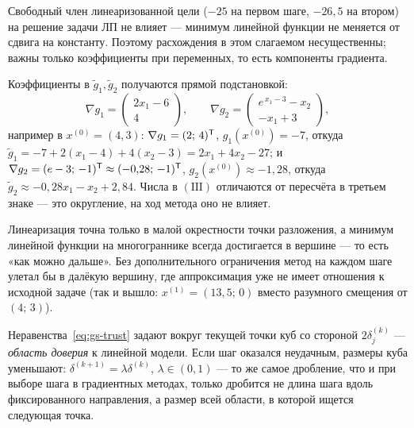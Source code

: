 \begin{idea}[title={О числах в примере}]
Свободный член линеаризованной цели ($-25$ на первом шаге, $-26{,}5$ на втором)
на решение задачи ЛП не влияет — минимум линейной функции не меняется от сдвига
на константу. Поэтому расхождения в этом слагаемом несущественны; важны только
коэффициенты при переменных, то есть компоненты градиента.

Коэффициенты в $\tilde g_1, \tilde g_2$ получаются прямой подстановкой:
\[
  \nabla g_1 = \begin{pmatrix} 2x_1 - 6 \\ 4 \end{pmatrix} ,
  \qquad
  \nabla g_2 = \begin{pmatrix} e^{\,x_1-3} - x_2 \\ -x_1 + 3 \end{pmatrix} ,
\]
например в $x^{(0)} = (4,3)$: $\nabla g_1 = (2;\,4)^{\mathsf{T}}$,
$g_1(x^{(0)}) = -7$, откуда $\tilde g_1 = -7 + 2(x_1-4) + 4(x_2-3)
= 2x_1 + 4x_2 - 27$; и $\nabla g_2 = (e - 3;\, -1)^{\mathsf{T}} \approx (-0{,}28;\,-1)^{\mathsf{T}}$,
$g_2(x^{(0)}) \approx -1{,}28$, откуда
$\tilde g_2 \approx -0{,}28x_1 - x_2 + 2{,}84$. Числа в $(\mathrm{III})$
отличаются от пересчёта в третьем знаке — это округление, на ход метода оно не
влияет.
\end{idea}

\begin{idea}[title={Смысл ограничения \eqref{eq:gs-trust}}]
Линеаризация точна только в малой окрестности точки разложения, а минимум
линейной функции на многограннике всегда достигается в вершине — то есть
«как можно дальше». Без дополнительного ограничения метод на каждом шаге
улетал бы в далёкую вершину, где аппроксимация уже не имеет отношения к
исходной задаче (так и вышло: $x^{(1)} = (13{,}5;\,0)$ вместо разумного
смещения от $(4;\,3)$).

Неравенства~\eqref{eq:gs-trust} задают вокруг текущей точки куб со стороной
$2\delta_j^{(k)}$ — \emph{область доверия} к линейной модели. Если шаг оказался
неудачным, размеры куба уменьшают: $\delta^{(k+1)} = \lambda\delta^{(k)}$,
$\lambda \in (0,1)$ — то же самое дробление, что и при выборе шага в
градиентных методах, только дробится не длина шага вдоль фиксированного
направления, а размер всей области, в которой ищется следующая точка.
\end{idea}
